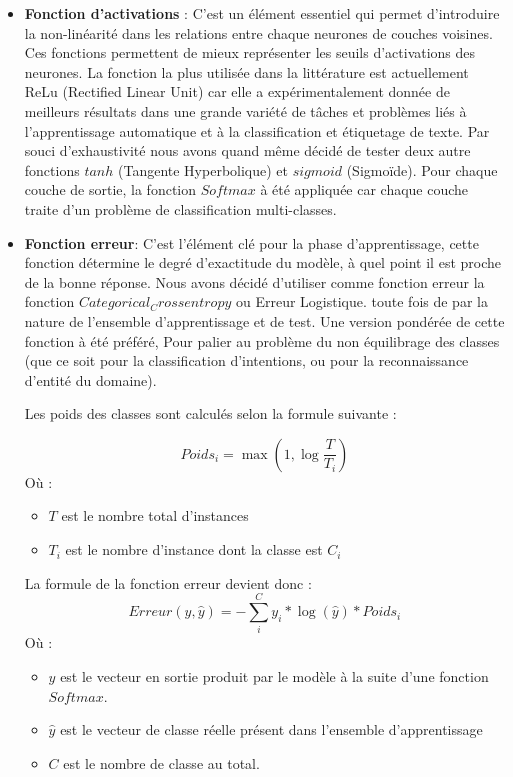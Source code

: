 \begin{itemize}
		\item \textbf{Fonction d'activations} : 
		C'est un élément essentiel qui permet d'introduire la non-linéarité dans les relations entre chaque neurones de couches voisines. Ces fonctions permettent de mieux représenter les seuils d'activations des neurones. La fonction la plus utilisée dans la littérature est actuellement ReLu (Rectified Linear Unit) car elle a expérimentalement donnée de meilleurs résultats dans une grande variété de tâches et problèmes liés à l'apprentissage automatique et à la classification et étiquetage de texte. Par souci d'exhaustivité nous avons quand même décidé de tester deux autre fonctions $tanh$ (Tangente Hyperbolique) et $sigmoid$ (Sigmoïde). Pour chaque couche de sortie, la fonction $Softmax$ à été appliquée car chaque couche traite d'un problème de classification multi-classes.
		\item \textbf{Fonction erreur}:
		C'est l'élément clé pour la phase d'apprentissage, cette fonction détermine le degré d'exactitude du modèle, à quel point il est proche de la bonne réponse. Nous avons décidé d'utiliser comme fonction erreur la fonction $Categorical_Crossentropy$ ou Erreur Logistique. toute fois de par la nature de l'ensemble d'apprentissage et de test. Une version pondérée de cette fonction à été préféré, Pour palier au problème du non équilibrage des classes (que ce soit pour la classification d'intentions, ou pour la reconnaissance d'entité du domaine).
		\par
		Les poids des classes sont calculés selon la formule suivante : 
		
		\begin{equation*}
			Poids_i = \max(1,\log{\frac{T}{T_i}})
		\end{equation*}
		Où :
		\begin{itemize}
			\item  $T$ est le nombre total d'instances
			\item  $T_i$ est le nombre d'instance dont la classe est $C_i$
		\end{itemize}
		
		La formule de la fonction erreur devient donc : 
		\begin{equation*}
			Erreur(y,\hat{y}) = - \sum_{i}^{C} y_i * \log(\hat{y}) * Poids_i 
		\end{equation*}
		Où : 
		\begin{itemize}
			\item $y$ est le vecteur en sortie produit par le modèle à la suite d'une fonction $Softmax$.
			\item $\hat{y}$ est le vecteur de classe réelle présent dans l'ensemble d'apprentissage
			\item $C$ est le nombre de classe au total.
		\end{itemize}
	

\end{itemize}
